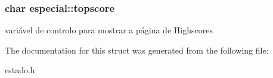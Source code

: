 \subsubsection[{\texorpdfstring{topscore}{topscore}}]{\setlength{\rightskip}{0pt plus 5cm}char especial\+::topscore}\hypertarget{structespecial_a01ca8b58821f5369af7239c571d2b248}{}\label{structespecial_a01ca8b58821f5369af7239c571d2b248}
variável de controlo para mostrar a página de Highscores 

The documentation for this struct was generated from the following file\+:\begin{DoxyCompactItemize}
\item 
estado.\+h\end{DoxyCompactItemize}
